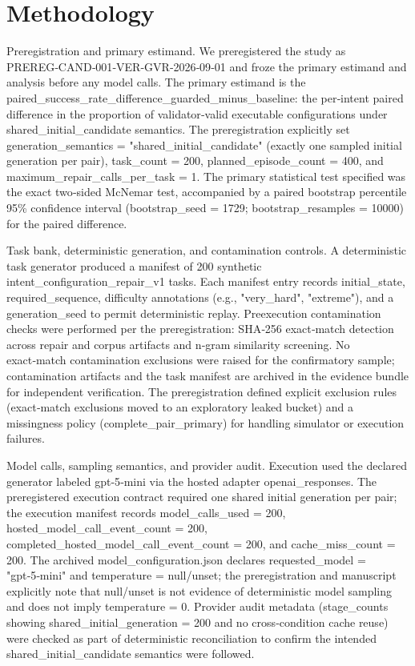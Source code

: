 \documentclass[conference]{IEEEtran}
\begin{document}
\section{Methodology}
Preregistration and primary estimand. We preregistered the study as PREREG‑CAND‑001‑VER‑GVR‑2026‑09‑01 and froze the primary estimand and analysis before any model calls. The primary estimand is the paired\_success\_rate\_difference\_guarded\_minus\_baseline: the per‑intent paired difference in the proportion of validator‑valid executable configurations under shared\_initial\_candidate semantics. The preregistration explicitly set generation\_semantics = "shared\_initial\_candidate" (exactly one sampled initial generation per pair), task\_count = 200, planned\_episode\_count = 400, and maximum\_repair\_calls\_per\_task = 1. The primary statistical test specified was the exact two‑sided McNemar test, accompanied by a paired bootstrap percentile 95\% confidence interval (bootstrap\_seed = 1729; bootstrap\_resamples = 10000) for the paired difference.

Task bank, deterministic generation, and contamination controls. A deterministic task generator produced a manifest of 200 synthetic intent\_configuration\_repair\_v1 tasks. Each manifest entry records initial\_state, required\_sequence, difficulty annotations (e.g., "very\_hard", "extreme"), and a generation\_seed to permit deterministic replay. Preexecution contamination checks were performed per the preregistration: SHA‑256 exact‑match detection across repair and corpus artifacts and n‑gram similarity screening. No exact‑match contamination exclusions were raised for the confirmatory sample; contamination artifacts and the task manifest are archived in the evidence bundle for independent verification. The preregistration defined explicit exclusion rules (exact‑match exclusions moved to an exploratory leaked bucket) and a missingness policy (complete\_pair\_primary) for handling simulator or execution failures.

Model calls, sampling semantics, and provider audit. Execution used the declared generator labeled gpt‑5‑mini via the hosted adapter openai\_responses. The preregistered execution contract required one shared initial generation per pair; the execution manifest records model\_calls\_used = 200, hosted\_model\_call\_event\_count = 200, completed\_hosted\_model\_call\_event\_count = 200, and cache\_miss\_count = 200. The archived model\_configuration.json declares requested\_model = "gpt‑5‑mini" and temperature = null/unset; the preregistration and manuscript explicitly note that null/unset is not evidence of deterministic model sampling and does not imply temperature = 0. Provider audit metadata (stage\_counts showing shared\_initial\_generation = 200 and no cross‑condition cache reuse) were checked as part of deterministic reconciliation to confirm the intended shared\_initial\_candidate semantics were followed.
\end{document}
